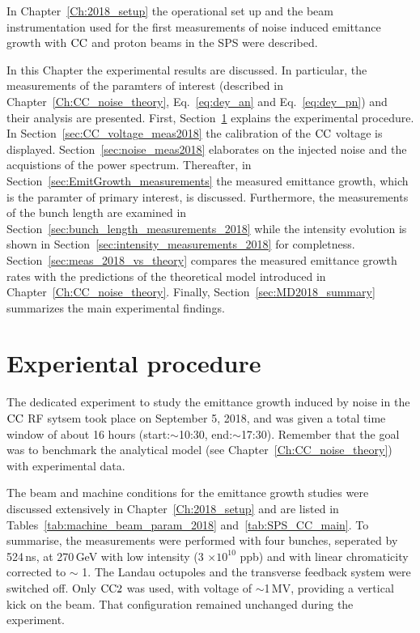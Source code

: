 \vspace*{-1mm}
In Chapter~\ref{Ch:2018_setup} the operational set up and the beam instrumentation used for the first measurements of noise induced emittance growth with ${\mathrm{CC}}$ and proton beams in the SPS were described. 


In this Chapter the experimental results are discussed. In particular, the measurements of the paramters of interest (described in Chapter~\ref{Ch:CC_noise_theory}, Eq.~\eqref{eq:dey_an} and Eq.~\eqref{eq:dey_pn}) and their analysis are presented. First, Section~\ref{sec:experimental_procedure_2018} explains the experimental procedure.  In Section~\ref{sec:CC_voltage_meas2018} the calibration of the ${\mathrm{CC}}$ voltage is displayed. Section~\ref{sec:noise_meas2018} elaborates on the injected noise and the acquistions of the power spectrum. Thereafter, in Section~\ref{sec:EmitGrowth_measurements} the measured emittance growth, which is the paramter of primary interest, is discussed. Furthermore, the measurements of the bunch length are examined in Section~\ref{sec:bunch_length_measurements_2018} while the intensity evolution is shown in Section~\ref{sec:intensity_measurements_2018} for completness. Section~\ref{sec:meas_2018_vs_theory} compares the measured emittance growth rates with the predictions of the theoretical model introduced in Chapter~\ref{Ch:CC_noise_theory}. Finally, Section~\ref{sec:MD2018_summary} summarizes the main experimental findings.


\section{Experiental procedure}\label{sec:experimental_procedure_2018}

The dedicated experiment to study the emittance growth induced by noise in the ${\mathrm{CC}}$ RF sytsem took place on September 5, 2018, and was given a total time window of about 16 hours (start:$\sim$10:30, end:$\sim$17:30). Remember that the goal was to benchmark the analytical model (see Chapter~\ref{Ch:CC_noise_theory}) with experimental data.

The beam and machine conditions for the emittance growth studies were discussed extensively in Chapter~\ref{Ch:2018_setup} and are listed in Tables~\ref{tab:machine_beam_param_2018} and~\ref{tab:SPS_CC_main}. To summarise, the measurements were performed with four bunches, seperated by 524\,ns, at 270\,GeV with low intensity (3 $\times \mathrm{10^{10}}$ ppb) and with linear chromaticity corrected to $\sim$ 1. The Landau octupoles and the transverse feedback system were switched off. Only ${\mathrm{CC}}2$ was used, with voltage of $\sim$1\,MV, providing a vertical kick on the beam. That configuration remained unchanged during the experiment.

